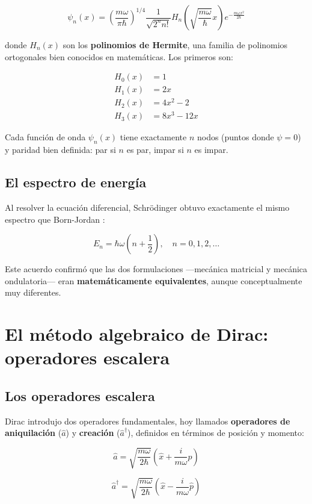 \documentclass[11pt,a4paper,spanish]{book}
\begin{document}
\[
\psi_n(x) = \left(\frac{m\omega}{\pi\hbar}\right)^{1/4} \frac{1}{\sqrt{2^n n!}} H_n\left(\sqrt{\frac{m\omega}{\hbar}}x\right) e^{-\frac{m\omega x^2}{2\hbar}}
\]

donde $H_n(x)$ son los \textbf{polinomios de Hermite}, una familia de polinomios ortogonales bien conocidos en matemáticas. Los primeros son:

\begin{align*}
	H_0(x) &= 1 \\
	H_1(x) &= 2x \\
	H_2(x) &= 4x^2 - 2 \\
	H_3(x) &= 8x^3 - 12x
\end{align*}

Cada función de onda $\psi_n(x)$ tiene exactamente $n$ nodos (puntos donde $\psi = 0$) y paridad bien definida: par si $n$ es par, impar si $n$ es impar.

\subsection*{El espectro de energía}

Al resolver la ecuación diferencial, Schrödinger obtuvo exactamente el mismo espectro que Born-Jordan \citep{born1925}:

\[
E_n = \hbar\omega\left(n + \frac{1}{2}\right), \quad n = 0, 1, 2, \ldots
\]

Este acuerdo confirmó que las dos formulaciones —mecánica matricial y mecánica ondulatoria— eran \textbf{matemáticamente equivalentes}, aunque conceptualmente muy diferentes.


\section{El método algebraico de Dirac: operadores escalera} \label{sec:dirac}

\subsection*{Los operadores escalera}

Dirac introdujo dos operadores fundamentales, hoy llamados \textbf{operadores de aniquilación} ($\hat{a}$) y \textbf{creación} ($\hat{a}^\dagger$), definidos en términos de posición y momento:

\[
\hat{a} = \sqrt{\frac{m\omega}{2\hbar}}\left(\hat{x} + \frac{i}{m\omega}\hat{p}\right)
\]

\[
\hat{a}^\dagger = \sqrt{\frac{m\omega}{2\hbar}}\left(\hat{x} - \frac{i}{m\omega}\hat{p}\right)
\]
\end{document}
